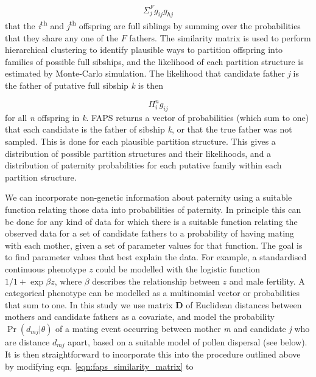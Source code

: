 \documentclass[10pt, a4paper, twocolumn]{article} %
\begin{document}
\begin{equation}\label{eqn:faps_similarity_matrix}
\Sigma_j^F g_{ij}g_{hj}
\end{equation}
that the \textit{i}\textsuperscript{th} and \textit{j}\textsuperscript{th} offspring are full siblings by summing over the probabilities that they share any one of the $F$ fathers. The similarity matrix is used to perform hierarchical clustering to identify plausible ways to partition offspring into families of possible full sibships, and the likelihood of each partition structure is estimated by Monte-Carlo simulation. The likelihood that candidate father \textit{j} is the father of putative full sibship \textit{k} is then

\begin{equation}\label{eqn:faps_lik_sibship}
\Pi_i^n g_{ij}
\end{equation}
for all \textit{n} offspring in \textit{k}. FAPS returns a vector of probabilities (which sum to one) that each candidate is the father of sibship \textit{k}, or that the true father was not sampled. This is done for each plausible partition structure. This gives a distribution of possible partition structures and their likelihoods, and a distribution of paternity probabilities for each putative family within each partition structure.

We can incorporate non-genetic information about paternity using a suitable function relating those data into probabilities of paternity. 
In principle this can be done for any kind of data for which there is a suitable function relating the observed data for a set of candidate fathers to a probability of having mating with each mother, given a set of parameter values for that function. The goal is to find parameter values that best explain the data. For example, a standardised continuous phenotype $z$ could be modelled with the logistic function $1/1+\exp{\beta z}$, where $\beta$ describes the relationship between $z$ and male fertility. A categorical phenotype can be modelled as a multinomial vector or probabilities that sum to one. In this study we use matrix \textbf{D} of Euclidean distances between mothers and candidate fathers as a covariate, and model the probability $\Pr(d_{mj}|\theta)$ of a mating event occurring between mother \textit{m} and candidate \textit{j} who are distance $d_{mj}$ apart, based on a suitable model of pollen dispersal (see below). It is then straightforward to incorporate this into the procedure outlined above by modifying eqn. \ref{eqn:faps_similarity_matrix} to
\end{document}
